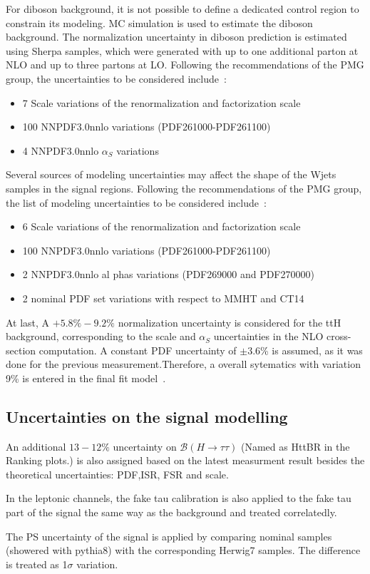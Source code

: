 For diboson background, it is not possible to define a dedicated control region to constrain its modeling. MC simulation is used to estimate the diboson background. The normalization uncertainty in diboson prediction is estimated using Sherpa samples, which were generated with up to one additional parton at NLO and up to three partons at LO. Following the recommendations of the PMG group, the uncertainties to be considered include~\cite{dibosonRes}: 
\begin{itemize}
	\item   7 Scale variations of the renormalization and factorization scale
	\item   100 NNPDF3.0nnlo variations (PDF261000-PDF261100)
	\item   4 NNPDF3.0nnlo $\alpha_{S}$ variations
\end{itemize}

Several sources of modeling uncertainties may affect the shape of the Wjets samples in the signal regions. Following the recommendations of the PMG group, the list of modeling uncertainties to be considered include~\cite{dibosonRes}:
\begin{itemize}
\item 6 Scale variations of the renormalization and factorization scale
\item 100 NNPDF3.0nnlo variations (PDF261000-PDF261100)
\item 2 NNPDF3.0nnlo al phas variations (PDF269000 and PDF270000)
\item 2 nominal PDF set variations with respect to MMHT and CT14
\end{itemize}

At last, A $+5.8\%-9.2\%$ normalization uncertainty is considered for the ttH background, corresponding to the scale and $\alpha_{S}$ uncertainties in the NLO cross-section computation. A constant PDF uncertainty of
$\pm3.6$\% is assumed, as it was done for the previous measurement.Therefore, a overall sytematics with variation 9\% is entered in the final fit model~\cite{ttZRun2}.

\subsection{Uncertainties on the signal modelling}

An additional $13-12\%$ uncertainty on $\mathcal{B}(H\to\tau\tau)$ (Named as HttBR in the Ranking plots.) is also assigned based on the latest measurment result \cite{HiggsBR} besides the theoretical uncertainties: PDF,ISR, FSR and scale.

In the leptonic channels, the fake tau calibration is also applied to the fake tau part of the signal the same way as the background and treated correlatedly.

The PS uncertainty of the signal is applied by comparing nominal samples (showered with pythia8) with the corresponding Herwig7 samples. The difference is treated as 1$\sigma$ variation.
